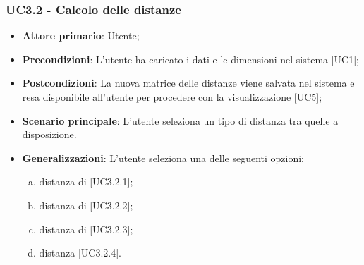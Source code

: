 \subsubsection{UC3.2 - Calcolo delle distanze}
\begin{itemize}
	\item \textbf{Attore primario}: Utente;
	\item \textbf{Precondizioni}: L'utente ha caricato i dati e le dimensioni nel sistema [UC1];
	\item \textbf{Postcondizioni}: La nuova matrice delle distanze viene salvata nel sistema e resa disponibile all'utente per procedere con la visualizzazione [UC5];

	\item \textbf{Scenario principale}: L'utente seleziona un tipo di distanza tra quelle a disposizione.
	
	\item \textbf{Generalizzazioni}: L'utente seleziona una delle seguenti opzioni:
	
	\begin{enumerate}[(a)]
		\item distanza di  [UC3.2.1];
		\item distanza di  [UC3.2.2];
		\item distanza di  [UC3.2.3];
		\item distanza  [UC3.2.4].
	\end{enumerate}
\end{itemize}